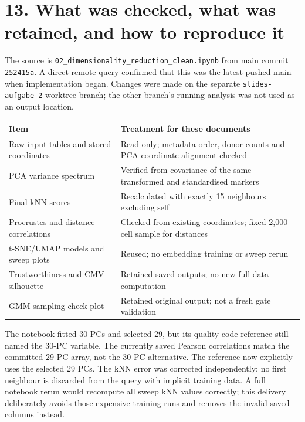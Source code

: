 \documentclass[11pt]{article}
\begin{document}
\clearpage
\section*{13. What was checked, what was retained, and how to reproduce it}
The source is \texttt{02\_dimensionality\_reduction\_clean.ipynb} from main commit \texttt{252415a}. A direct remote query confirmed that this was the latest pushed main when implementation began. Changes were made on the separate \texttt{slides-aufgabe-2} worktree branch; the other branch's running analysis was not used as an output location.

\begin{center}
\begin{tabular}{p{.38\linewidth}p{.54\linewidth}}\toprule
Item & Treatment for these documents\\\midrule
Raw input tables and stored coordinates & Read-only; metadata order, donor counts and PCA-coordinate alignment checked\\
PCA variance spectrum & Verified from covariance of the same transformed and standardised markers\\
Final kNN scores & Recalculated with exactly 15 neighbours excluding self\\
Procrustes and distance correlations & Checked from existing coordinates; fixed 2,000-cell sample for distances\\
t-SNE/UMAP models and sweep plots & Reused; no embedding training or sweep rerun\\
Trustworthiness and CMV silhouette & Retained saved outputs; no new full-data computation\\
GMM sampling-check plot & Retained original output; not a fresh gate validation\\\bottomrule
\end{tabular}
\end{center}

The notebook fitted 30 PCs and selected 29, but its quality-code reference still named the 30-PC variable. The currently saved Pearson correlations match the committed 29-PC array, not the 30-PC alternative. The reference now explicitly uses the selected 29 PCs. The kNN error was corrected independently: no first neighbour is discarded from the query with implicit training data. A full notebook rerun would recompute all sweep kNN values correctly; this delivery deliberately avoids those expensive training runs and removes the invalid saved columns instead.
\end{document}
